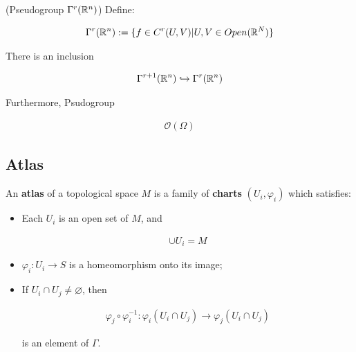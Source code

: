 \documentclass[Total.tex]{subfiles}
\begin{document}
				\begin{example}
					(Pseudogroup $\Gamma^r(\mathbb{R}^n)$) Define:
					
					\begin{gather*}
						\Gamma^r(\mathbb{R}^n):=\{f\in C^r(U,V)|U,V\in Open(\mathbb{R}^N)\}
					\end{gather*}
					
					There is an inclusion
					
					\begin{gather*}
						\Gamma^{r+1}(\mathbb{R}^n)\hookrightarrow \Gamma^{r}(\mathbb{R}^n)
					\end{gather*}
				\end{example}
				
				\begin{example}
					Furthermore, Psudogroup
					
					\begin{gather*}
						\mathcal{O}(\Omega)
					\end{gather*}
				\end{example}
				
				\subsection{Atlas}
				
				\begin{Def}
					An \textbf{atlas} of a topological space $M$ is a family of \textbf{charts} $(U_i,\varphi_i)$ which satisfies:
					
					\begin{itemize}
						\item Each $U_i$ is an open set of $M$, and 
						
						\begin{gather*}
							\cup U_i=M
						\end{gather*}
						\item $\varphi_i:U_i\rightarrow S$ is a homeomorphism onto its image;
						\item If $U_i\cap U_j\not=\varnothing$, then
						
						\begin{gather*}
							\varphi_j\circ \varphi_i^{-1}:\varphi_i(U_i\cap U_j)\rightarrow \varphi_j(U_i\cap U_j)
						\end{gather*}
						
						is an element of $\Gamma$.
					\end{itemize}
				\end{Def}
				
\end{document}
